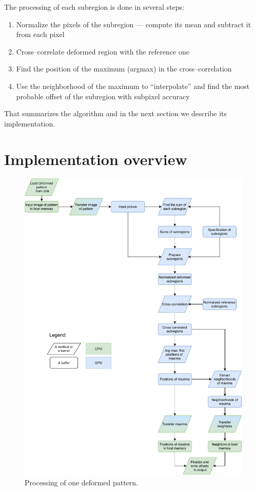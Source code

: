 The processing of each subregion is done in several steps:
\begin{enumerate}
	\item Normalize the pixels of the subregion --- compute its mean and subtract it from each pixel
	\item Cross--correlate deformed region with the reference one
	\item Find the position of the maximum (argmax) in the cross--correlation
	\item Use the neighborhood of the maximum to ``interpolate'' and find the most probable offset of the subregion with subpixel accuracy
\end{enumerate}
That summarizes the algorithm and in the next section we describe its implementation.


\section{Implementation overview}

\begin{figure}
	\centering
	\includegraphics[width=\textwidth]{img/overview}
	\caption{Processing of one deformed pattern.}
	\label{overview}
\end{figure}

